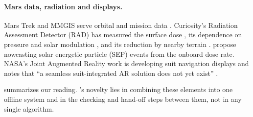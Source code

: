 \paragraph{Mars data, radiation and displays.} Mars Trek and MMGIS serve orbital and mission data \citep{marstrek,mmgis}. Curiosity's Radiation Assessment Detector (RAD) has measured the surface dose \citep{hassler2014}, its dependence on pressure and solar modulation \citep{guo2015}, and its reduction by nearby terrain \citep{guo2026}.  propose nowcasting solar energetic particle (SEP) events from the onboard dose rate. NASA's Joint Augmented Reality work is developing suit navigation displays and notes that ``a seamless suit-integrated AR solution does not yet exist'' \citep{miller2022ar}.

 summarizes our reading. \Marswalk's novelty lies in combining these elements into one offline system and in the checking and hand-off steps between them, not in any single algorithm.

